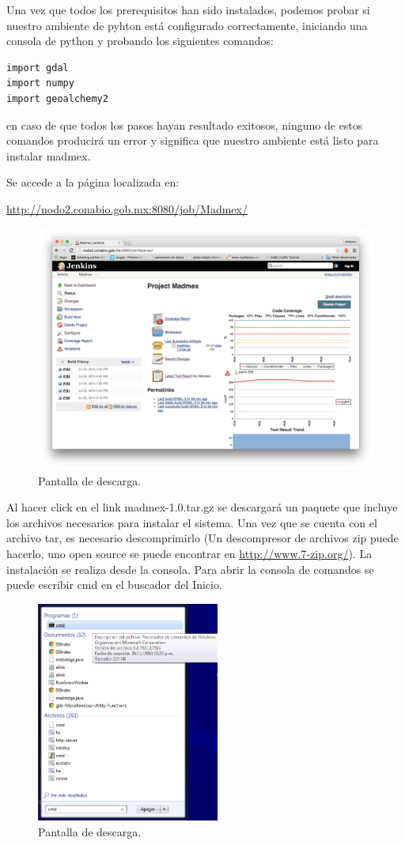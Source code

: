 \documentclass[11pt, spanish]{memoir}
\begin{document}
Una vez que todos los prerequisitos han sido instalados, podemos probar si nuestro ambiente de pyhton está configurado correctamente, iniciando una consola de python y probando los siguientes comandos:

\begin{lstlisting}
import gdal
import numpy
import geoalchemy2
\end{lstlisting}

en caso de que todos los pasos hayan resultado exitosos, ninguno de estos comandos producirá un error y significa que nuestro ambiente está listo para instalar madmex.

Se accede a la página localizada en:

\url{http://nodo2.conabio.gob.mx:8080/job/Madmex/}

\begin{figure}[H]
\centering
\includegraphics[width=14cm]{screen1.png}
\caption{Pantalla de descarga. \label{overflow}}
\end{figure}
Al hacer click en el link madmex-1.0.tar.gz se descargará un paquete que incluye
los archivos necesarios para instalar el sistema. Una vez que se cuenta con el
archivo tar, es necesario descomprimirlo (Un descompresor de archivos zip puede
hacerlo, uno open source se puede encontrar en \url{http://www.7-zip.org/}). La
instalación se realiza desde la consola. Para abrir la consola de comandos se puede
escribir cmd en el buscador del Inicio.

\begin{figure}[H]
\centering
\includegraphics[width=6cm]{command1.png}
\caption{Pantalla de descarga. \label{overflow}}
\end{figure}
\end{document}
